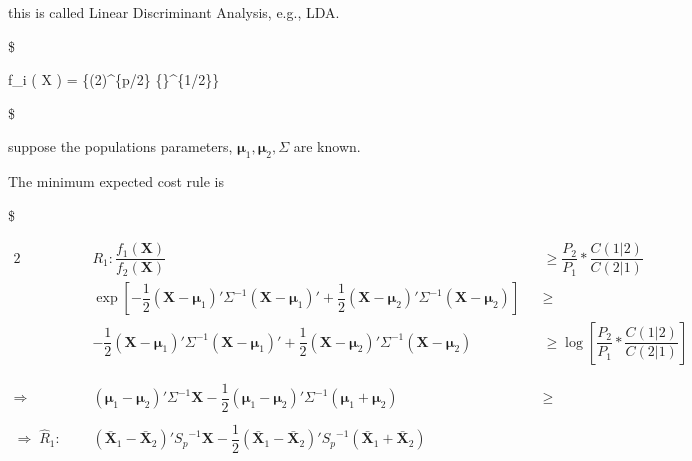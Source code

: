 \documentclass[
]{book}
\begin{document}
{{{this is called Linear Discriminant Analysis, e.g., LDA.

\$

f\_i ( \pmb X ) =  \{(2\pi)\^{}\{p/2\} \{\lvert \Sigma \rvert\}\^{}\{1/2\}\} \exp {}

\$

suppose the populations parameters, \(\pmb \mu_1, \pmb \mu_2, \Sigma\) are known.

The minimum expected cost rule is

\$

\begin{alignat*}{2}


&R_1 : \dfrac {f_1 ( \pmb X)} {f_2 ( \pmb X)} &
&\ge  \dfrac {P_2}{P_1} \ast \dfrac {C(1\vert2)}{C(2\vert1)} \\



&\exp \left[ 
-\dfrac {1} {2} (\pmb X - \pmb \mu_1)' \Sigma^{-1} (\pmb X - \pmb \mu_1)' +\dfrac {1} {2} (\pmb X - \pmb \mu_2)' \Sigma^{-1} (\pmb X - \pmb \mu_2)

\right]&

&\ge \\



&-\dfrac {1} {2} (\pmb X - \pmb \mu_1)' \Sigma^{-1} (\pmb X - \pmb \mu_1)' +\dfrac {1} {2} (\pmb X - \pmb \mu_2)' \Sigma^{-1} (\pmb X - \pmb \mu_2) &

&\ge \log \left[ \dfrac {P_2}{P_1} \ast \dfrac {C(1\vert2)}{C(2\vert1)} \right] \\

\\
\\


\Rightarrow \; \; \; \; \;



&(\pmb \mu_1 - \pmb \mu_2)' \Sigma^{-1} \pmb X - \dfrac {1}{2} (\pmb \mu_1 - \pmb \mu_2)' \Sigma^{-1} (\pmb \mu_1 + \pmb \mu_2) &

&\ge 


\\
\\


\Rightarrow \; \hat R_1 \colon \; \; \; \; \; 



&(\bar {\pmb X}_1 - \bar {\pmb X}_2)' {S_p}^{-1} \pmb X - \dfrac {1}{2} (\bar {\pmb X}_1 - \bar {\pmb X}_2)' {S_p}^{-1} (\bar {\pmb X}_1 + \bar {\pmb X}_2) &


\end{alignat*}}}}
\end{document}
